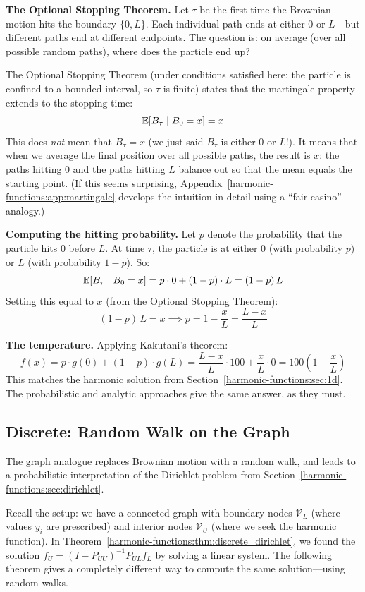 \begin{notechapter}
\begin{examplebox}[title=Brownian Motion on the 1D Rod]
\textbf{The Optional Stopping Theorem.} Let $\tau$ be the first time the
Brownian motion hits the boundary $\{0, L\}$. Each individual path ends at
either $0$ or $L$---but different paths end at different endpoints. The
question is: on average (over all possible random paths), where does the
particle end up?

The Optional Stopping Theorem (under conditions satisfied here: the
particle is confined to a bounded interval, so $\tau$ is finite) states
that the martingale property extends to the stopping time:
\[
\mathbb{E}[B_\tau \mid B_0 = x] = x
\]
This does \emph{not} mean that $B_\tau = x$ (we just said $B_\tau$ is
either $0$ or $L$!). It means that when we average the final position over
all possible paths, the result is $x$: the paths hitting $0$ and the paths
hitting $L$ balance out so that the mean equals the starting point. (If this
seems surprising, Appendix~\ref{harmonic-functions:app:martingale} develops the intuition in
detail using a ``fair casino'' analogy.)

\textbf{Computing the hitting probability.} Let $p$ denote the probability
that the particle hits $0$ before $L$. At time $\tau$, the particle is at
either $0$ (with probability $p$) or $L$ (with probability $1-p$). So:
\[
\mathbb{E}[B_\tau \mid B_0 = x] = p \cdot 0 + (1-p) \cdot L = (1-p)\,L
\]
Setting this equal to $x$ (from the Optional Stopping Theorem):
\[
(1-p)\,L = x \implies p = 1 - \frac{x}{L} = \frac{L-x}{L}
\]

\textbf{The temperature.} Applying Kakutani's theorem:
\[
f(x) = p \cdot g(0) + (1-p) \cdot g(L)
= \frac{L-x}{L} \cdot 100 + \frac{x}{L} \cdot 0
= 100\left(1 - \frac{x}{L}\right)
\]
This matches the harmonic solution from Section~\ref{harmonic-functions:sec:1d}. The
probabilistic and analytic approaches give the same answer, as they must.
\end{examplebox}

\subsection{Discrete: Random Walk on the Graph}

The graph analogue replaces Brownian motion with a random walk, and leads to
a probabilistic interpretation of the Dirichlet problem from
Section~\ref{harmonic-functions:sec:dirichlet}.

Recall the setup: we have a connected graph with boundary nodes
$\mathcal{V}_L$ (where values $y_i$ are prescribed) and interior nodes
$\mathcal{V}_U$ (where we seek the harmonic function). In
Theorem~\ref{harmonic-functions:thm:discrete_dirichlet}, we found the solution
$f_U = (I - P_{UU})^{-1}P_{UL}f_L$ by solving a linear system. The
following theorem gives a completely different way to compute the same
solution---using random walks.


\end{notechapter}
